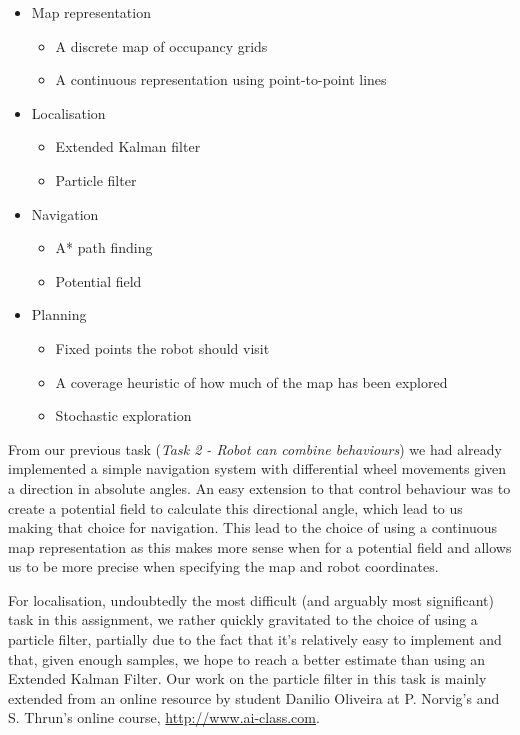 \documentclass[paper=a4, fontsize=12pt]{scrartcl}	%
\numberwithin{equation}{section}		%
\numberwithin{figure}{section}			%
\numberwithin{table}{section}				%
\begin{document}
\begin{itemize}
\item Map representation 
\begin{itemize}
\item A discrete map of occupancy grids
\item A continuous representation using point-to-point lines
\end{itemize}
\item Localisation
\begin{itemize}
\item Extended Kalman filter
\item Particle filter
\end{itemize}
\item Navigation
\begin{itemize}
\item A* path finding
\item Potential field
\end{itemize}
\item Planning
\begin{itemize}
\item Fixed points the robot should visit
\item A coverage heuristic of how much of the map has been explored
\item Stochastic exploration
\end{itemize}
\end{itemize}

From our previous task (\emph{Task 2 - Robot can combine behaviours}) we had already implemented a simple navigation system with differential wheel movements given a direction in absolute angles. An easy extension to that control behaviour was to create a potential field to calculate this directional angle, which lead to us making that choice for navigation. This lead to the choice of using a continuous map representation as this makes more sense when for a potential field and allows us to be more precise when specifying the map and robot coordinates.

For localisation, undoubtedly the most difficult (and arguably most significant) task in this assignment, we rather quickly gravitated to the choice of using a particle filter, partially due to the fact that it's relatively easy to implement and that, given enough samples, we hope to reach a better estimate than using an Extended Kalman Filter. Our work on the particle filter in this task is mainly extended from an online resource by student Danilio Oliveira at P. Norvig's and S. Thrun's online course, \url{http://www.ai-class.com}. \cite{oliveira}\cite{aiclass}
\end{document}
